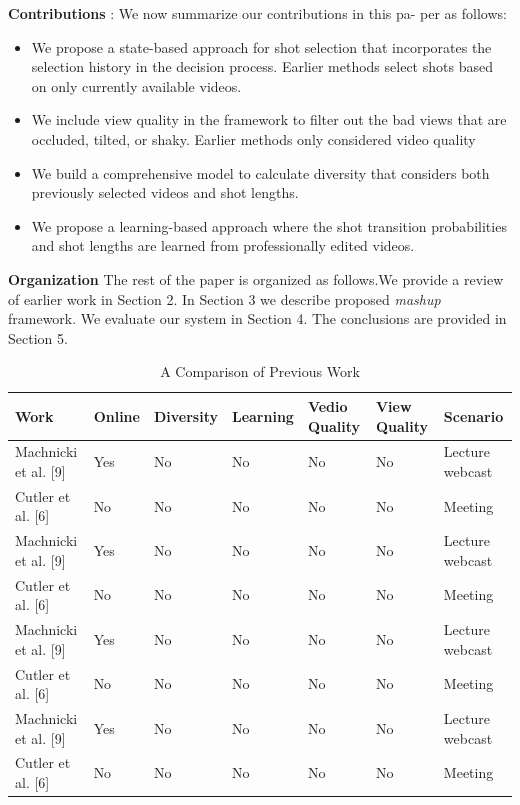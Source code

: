 \documentclass{IEEEtran}
\begin{document}
\textbf{Contributions} : We now summarize our contributions in this pa-
per as follows:
\begin{itemize}
    \item We propose a state-based approach for shot selection that incorporates the selection history in the decision process. Earlier methods select shots based on only currently available videos.
    \item We include view quality in the framework to filter out the bad views that are occluded, tilted, or shaky. Earlier methods only considered video quality
    \item We build a comprehensive model to calculate diversity that considers both previously selected videos and shot lengths.
    \item We propose a learning-based approach where the shot transition probabilities and shot lengths are learned from professionally edited videos.
\end{itemize}
\textbf{Organization} The rest of the paper is organized as follows.We provide a review of earlier work in Section 2. In Section 3 we describe proposed \textit{mashup} framework. We evaluate our system in Section 4. The conclusions are provided in Section 5.
\begin{table}[t]
  \centering
  \caption{A Comparison of Previous Work}
  \begin{tabular}{l|l|l|l|l|l|l}
  \hline
   Work & Online & Diversity & Learning & Vedio Quality & View Quality & Scenario \\\hline
   Machnicki et al. [9]& Yes& No& No& No& No& Lecture webcast\\\hline
    Cutler et al. [6]& No& No& No &No& No& Meeting\\\hline
     Machnicki et al. [9]& Yes& No& No& No& No& Lecture webcast\\\hline
    Cutler et al. [6]& No& No& No &No& No& Meeting\\\hline
     Machnicki et al. [9]& Yes& No& No& No& No& Lecture webcast\\\hline
    Cutler et al. [6]& No& No& No &No& No& Meeting\\\hline
     Machnicki et al. [9]& Yes& No& No& No& No& Lecture webcast\\\hline
    Cutler et al. [6]& No& No& No &No& No& Meeting\\\hline
  \end{tabular}
  
  \label{tab:1}
\end{table}
\end{document}
